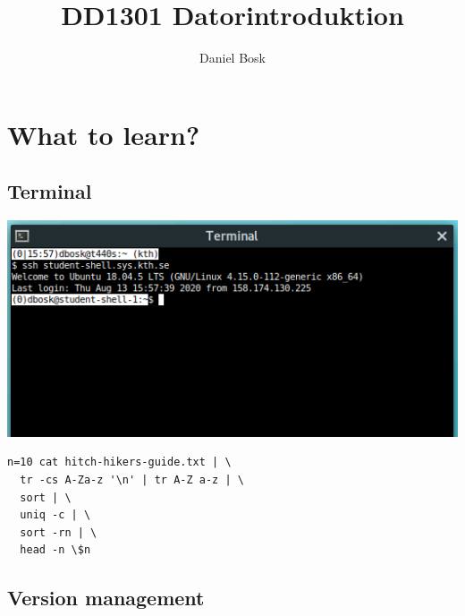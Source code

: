 \title{%
  DD1301 Datorintroduktion
}
\author{Daniel Bosk}


\mode*


\section{What to learn?}

\subsection{Terminal}

\begin{frame}
  \includegraphics[width=\columnwidth]{../../terminal/terminal.png}
\end{frame}

\begin{frame}[fragile]
  \begin{lstlisting}[numbers=none]
n=10 cat hitch-hikers-guide.txt | \
  tr -cs A-Za-z '\n' | tr A-Z a-z | \
  sort | \
  uniq -c | \
  sort -rn | \
  head -n \$n
  \end{lstlisting}
\end{frame}


\subsection{Version management}

